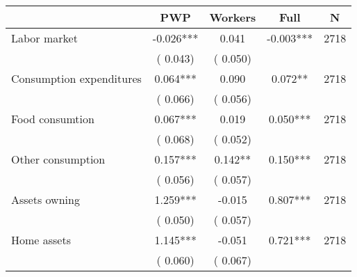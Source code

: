 
\begin{tabular}{l*{4}{c}}\hline&\multicolumn{1}{c}{PWP}&\multicolumn{1}{c}{Workers}&\multicolumn{1}{c}{Full}&\multicolumn{1}{c}{N} \\ \hline

 Labor market &             -0.026*** &         0.041 &          -0.003*** & 2718                       \\  
                 &        (       0.043)                   &        (       0.050)                        &                                                             &                                                      \\      

 Consumption expenditures &              0.064*** &         0.090 &           0.072** & 2718                       \\  
                 &        (       0.066)                   &        (       0.056)                        &                                                             &                                                      \\      

 Food consumtion &              0.067*** &         0.019 &           0.050*** & 2718                       \\  
                 &        (       0.068)                   &        (       0.052)                        &                                                             &                                                      \\      

 Other consumption &              0.157*** &         0.142** &           0.150*** & 2718                       \\  
                 &        (       0.056)                   &        (       0.057)                        &                                                             &                                                      \\      

 Assets owning &              1.259*** &        -0.015 &           0.807*** & 2718                       \\  
                 &        (       0.050)                   &        (       0.057)                        &                                                             &                                                      \\      

 Home assets &              1.145*** &        -0.051 &           0.721*** & 2718                       \\  
                 &        (       0.060)                   &        (       0.067)                        &                                                             &                                                      \\      


\end{tabular}
